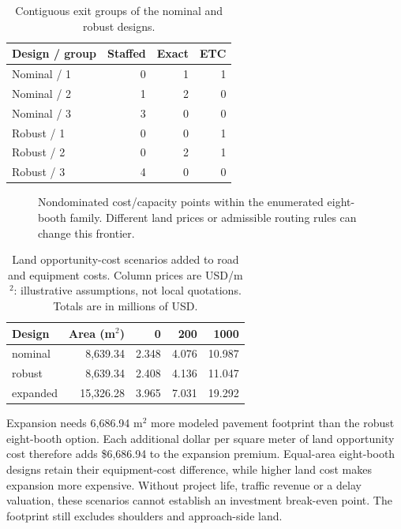\documentclass[12pt,letterpaper]{article}
\begin{document}
\begin{table}[H]\centering\small\caption{Contiguous exit groups of the nominal and robust designs.}\begin{tabular}{@{}lrrr@{}}\toprule
Design / group & Staffed & Exact & ETC\\\midrule
Nominal / 1 & 0 & 1 & 1\\
Nominal / 2 & 1 & 2 & 0\\
Nominal / 3 & 3 & 0 & 0\\
Robust / 1 & 0 & 0 & 1\\
Robust / 2 & 0 & 2 & 1\\
Robust / 3 & 4 & 0 & 0\\
\bottomrule\end{tabular}\end{table}
\begin{figure}[htbp]\centering{}\caption{Nondominated cost/capacity points within the enumerated eight-booth family. Different land prices or admissible routing rules can change this frontier.}\label{fig:frontier}\end{figure}
\begin{table}[H]\centering\small\caption{Land opportunity-cost scenarios added to road and equipment costs. Column prices are USD/m$^2$: illustrative assumptions, not local quotations. Totals are in millions of USD.}\begin{tabular}{@{}lrrrr@{}}\toprule
Design & Area (m$^2$) & 0 & 200 & 1000\\\midrule
nominal & 8,639.34 & 2.348 & 4.076 & 10.987\\
robust & 8,639.34 & 2.408 & 4.136 & 11.047\\
expanded & 15,326.28 & 3.965 & 7.031 & 19.292\\
\bottomrule\end{tabular}\end{table}
Expansion needs 6,686.94 m$^2$ more modeled pavement footprint than the robust eight-booth option. Each additional dollar per square meter of land opportunity cost therefore adds \$6,686.94 to the expansion premium. Equal-area eight-booth designs retain their equipment-cost difference, while higher land cost makes expansion more expensive. Without project life, traffic revenue or a delay valuation, these scenarios cannot establish an investment break-even point. The footprint still excludes shoulders and approach-side land.
\end{document}
